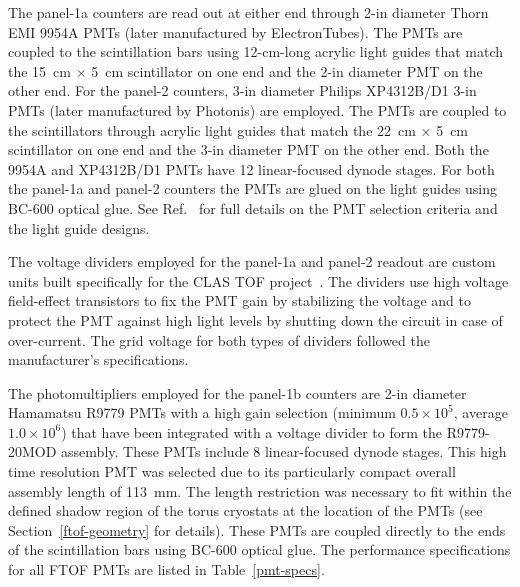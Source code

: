 \documentclass[3p,times,twocolumn]{elsarticle}
\begin{document}
The panel-1a counters are read out at either end through 2-in diameter Thorn EMI 9954A PMTs (later
manufactured by ElectronTubes). The PMTs are coupled to the scintillation bars using 12-cm-long acrylic
light guides that match the 15~cm $\times$ 5~cm scintillator on one end and the 2-in diameter PMT on
the other end.  For the panel-2 counters, 3-in diameter Philips XP4312B/D1 3-in PMTs (later manufactured
by Photonis) are employed. The PMTs are coupled to the scintillators through acrylic light guides that match
the 22~cm $\times$ 5~cm scintillator on one end and the 3-in diameter PMT on the other end. Both the
9954A and XP4312B/D1 PMTs have 12 linear-focused dynode stages. For both the panel-1a and panel-2
counters the PMTs are glued on the light guides using BC-600 optical glue. See Ref.~\cite{tof-nim} for
full details on the PMT selection criteria and the light guide designs.

The voltage dividers employed for the panel-1a and panel-2 readout are custom units built specifically
for the CLAS TOF project~\cite{tof-nim}. The dividers use high voltage field-effect transistors to fix
the PMT gain by stabilizing the voltage and to protect the PMT against high light levels by shutting down
the circuit in case of over-current. The grid voltage for both types of dividers followed the
manufacturer's specifications.

The photomultipliers employed for the panel-1b counters are 2-in diameter Hamamatsu R9779 PMTs with
a high gain selection (minimum $0.5 \times 10^5$, average $1.0 \times 10^6$) that have been integrated
with a voltage divider to form the R9779-20MOD assembly. These PMTs include 8 linear-focused dynode
stages. This high time resolution PMT was selected due to its particularly compact overall assembly length
of 113~mm. The length restriction was necessary to fit within the defined shadow region of the torus
cryostats at the location of the PMTs (see Section~\ref{ftof-geometry} for details). These PMTs are
coupled directly to the ends of the scintillation bars using BC-600 optical glue. The performance
specifications for all FTOF PMTs are listed in Table~\ref{pmt-specs}.
\end{document}
